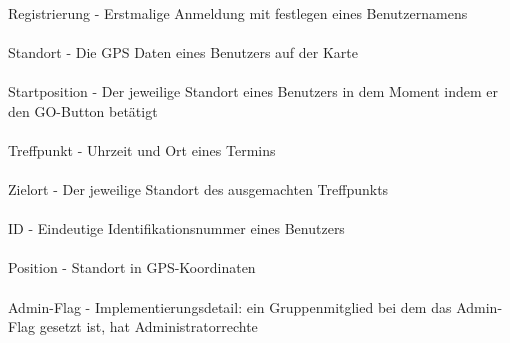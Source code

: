 \\
Registrierung - Erstmalige Anmeldung mit festlegen eines Benutzernamens\\
\\
Standort - Die GPS Daten eines Benutzers auf der Karte\\
\\
Startposition - Der jeweilige Standort eines Benutzers in dem Moment indem er den GO-Button betätigt\\
\\
Treffpunkt - Uhrzeit und Ort eines Termins\\
\\
Zielort - Der jeweilige Standort des ausgemachten Treffpunkts\\
\\
ID - Eindeutige Identifikationsnummer eines Benutzers\\
\\
Position - Standort in GPS-Koordinaten\\
\\
Admin-Flag - Implementierungsdetail: ein Gruppenmitglied bei dem das Admin-Flag gesetzt ist, hat Administratorrechte\\
\\

